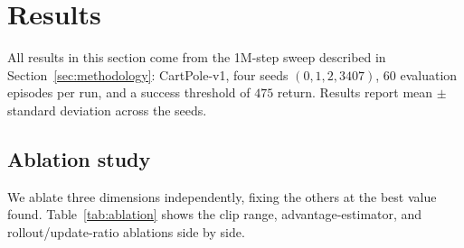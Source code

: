 \documentclass{article}
\begin{document}
\section{Results}

All results in this section come from the 1M-step sweep described in Section~\ref{sec:methodology}: CartPole-v1, four seeds $(0,1,2,3407)$, 60 evaluation episodes per run, and a success threshold of $475$ return. Results report mean $\pm$ standard deviation across the seeds.

\subsection{Ablation study}

We ablate three dimensions independently, fixing the others at the best value found. Table~\ref{tab:ablation} shows the clip range, advantage-estimator, and rollout/update-ratio ablations side by side.
\end{document}
